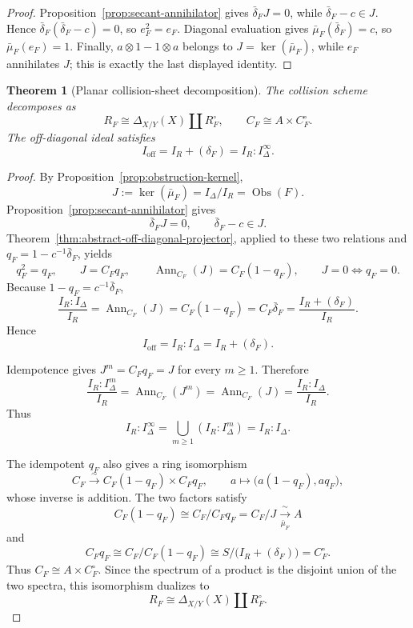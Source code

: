 \documentclass[11pt]{article}
\newtheorem{theorem}{Theorem}[section]
\theoremstyle{remark}
\theoremstyle{definition}
\DeclareMathOperator{\Ann}{Ann}
\newcommand{\Obs}{\operatorname{Obs}}
\begin{document}
\begin{proof}
Proposition~\ref{prop:secant-annihilator} gives
\(\bar\delta_FJ=0\), while
\(\bar\delta_F-c\in J\).  Hence
\(\bar\delta_F(\bar\delta_F-c)=0\), so
\(e_F^2=e_F\).
Diagonal evaluation gives
\(\bar\mu_F(\bar\delta_F)=c\), so
\(\bar\mu_F(e_F)=1\).  Finally,
\(a\otimes1-1\otimes a\) belongs to
\(J=\ker(\bar\mu_F)\), while \(e_F\) annihilates \(J\); this is exactly the
last displayed identity.
\end{proof}

\begin{theorem}[Planar collision-sheet decomposition]
\label{thm:collision-sheet-decomposition}
The collision scheme decomposes as
\[
  R_F\cong\Delta_{X/Y}(X)\amalg R_F^\circ,
  \qquad
  C_F\cong A\times C_F^\circ.
\]
The off-diagonal ideal satisfies
\[
  I_{\mathrm{off}}
  =
  I_R+(\delta_F)
  =
  I_R:I_\Delta^\infty.
\]
\end{theorem}

\begin{proof}
By Proposition~\ref{prop:obstruction-kernel},
\[
  J
  :=
  \ker(\bar\mu_F)
  =
  I_\Delta/I_R
  =
  \Obs(F).
\]
Proposition~\ref{prop:secant-annihilator} gives
\[
  \bar\delta_FJ=0,
  \qquad
  \bar\delta_F-c\in J.
\]
Theorem~\ref{thm:abstract-off-diagonal-projector}, applied to these two
relations and \(q_F=1-c^{-1}\bar\delta_F\), yields
\[
  q_F^2=q_F,
  \qquad
  J=C_Fq_F,
  \qquad
  \Ann_{C_F}(J)=C_F(1-q_F),
  \qquad
  J=0\Longleftrightarrow q_F=0.
\]
Because \(1-q_F=c^{-1}\bar\delta_F\),
\[
  \frac{I_R:I_\Delta}{I_R}
  =
  \Ann_{C_F}(J)
  =
  C_F(1-q_F)
  =
  C_F\bar\delta_F
  =
  \frac{I_R+(\delta_F)}{I_R}.
\]
Hence
\[
  I_{\mathrm{off}}
  =
  I_R:I_\Delta
  =
  I_R+(\delta_F).
\]

Idempotence gives \(J^m=C_Fq_F=J\) for every \(m\geq1\).  Therefore
\[
  \frac{I_R:I_\Delta^m}{I_R}
  =
  \Ann_{C_F}(J^m)
  =
  \Ann_{C_F}(J)
  =
  \frac{I_R:I_\Delta}{I_R}.
\]
Thus
\[
  I_R:I_\Delta^\infty
  =
  \bigcup_{m\geq1}(I_R:I_\Delta^m)
  =
  I_R:I_\Delta.
\]

The idempotent \(q_F\) also gives a ring isomorphism
\[
  C_F
  \xrightarrow{\ \sim\ }
  C_F(1-q_F)\times C_Fq_F,
  \qquad
  a\longmapsto\bigl(a(1-q_F),aq_F\bigr),
\]
whose inverse is addition.  The two factors satisfy
\[
  C_F(1-q_F)
  \cong
  C_F/C_Fq_F
  =
  C_F/J
  \xrightarrow[\bar\mu_F]{\ \sim\ }
  A
\]
and
\[
  C_Fq_F
  \cong
  C_F/C_F(1-q_F)
  \cong
  S\big/\bigl(I_R+(\delta_F)\bigr)
  =
  C_F^\circ.
\]
Thus \(C_F\cong A\times C_F^\circ\).  Since the spectrum of a product is
the disjoint union of the two spectra, this isomorphism dualizes to
\[
  R_F\cong\Delta_{X/Y}(X)\amalg R_F^\circ.
\]
\end{proof}
\end{document}
